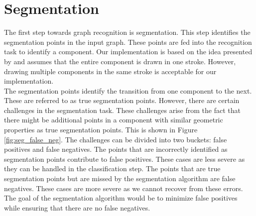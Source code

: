 \section{Segmentation}
\label{sec:segmentation}
The first step towards graph recognition is segmentation. This step identifies the segmentation points in the input graph. These points are fed into the recognition task to identify a component. Our implementation is based on the idea presented by \citeauthor{daly2015hand} \cite{daly2015hand} and assumes that the entire component is drawn in one stroke. However, drawing multiple components in the same stroke is acceptable for our implementation.\\

The segmentation points identify the transition from one component to the next. These are referred to as true segmentation points.  However, there are certain challenges in the segmentation task. These challenges arise from the fact that there might be additional points in a component with similar geometric properties as true segmentation points. This is shown in Figure \ref{fig:seg_false_neg}. The challenges can be divided into two buckets: false positives and false negatives. The points that are incorrectly identified as segmentation points contribute to false positives. These cases are less severe as they can be handled in the classification step. The points that are true segmentation points but are missed by the segmentation algorithm are false negatives. These cases are more severe as we cannot recover from these errors. The goal of the segmentation algorithm would be to minimize false positives while ensuring that there are no false negatives.\\

